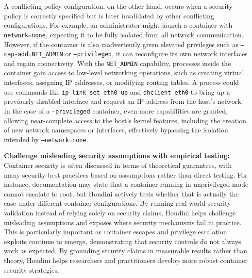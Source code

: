 \begin{doublespace}
A conflicting policy configuration, on the other hand, occurs when a security policy is correctly specified but is later invalidated by other conflicting configurations. For example, an administrator might launch a container with \texttt{--network=none}, expecting it to be fully isolated from all network communication. However, if the container is also inadvertently given elevated privileges such as \texttt{--cap-add=NET\_ADMIN} or \texttt{--privileged}, it can reconfigure its own network interfaces and regain connectivity. With the \texttt{NET\_ADMIN} capability, processes inside the container gain access to low-level networking operations, such as creating virtual interfaces, assigning IP addresses, or modifying routing tables. A process could use commands like \texttt{ip link set eth0 up} and \texttt{dhclient eth0} to bring up a previously disabled interface and request an IP address from the host's network. In the case of a \texttt{--privileged} container, even more capabilities are granted, allowing near-complete access to the host's kernel features, including the creation of new network namespaces or interfaces, effectively bypassing the isolation intended by \texttt{--network=none}.

\noindent\textbf{Challenge misleading security assumptions with empirical testing:}
Container security is often discussed in terms of theoretical guarantees, with many security best practices based on assumptions rather than direct testing. For instance, documentation may state that a container running in unprivileged mode cannot escalate to root, but Houdini actively tests whether that is actually the case under different container configurations. By running real-world security validation instead of relying solely on security claims, Houdini helps challenge misleading assumptions and exposes where security mechanisms fail in practice. This is particularly important as container escapes and privilege escalation exploits continue to emerge, demonstrating that security controls do not always work as expected. By grounding security claims in measurable results rather than theory, Houdini helps researchers and practitioners develop more robust container security strategies.


\end{doublespace}
